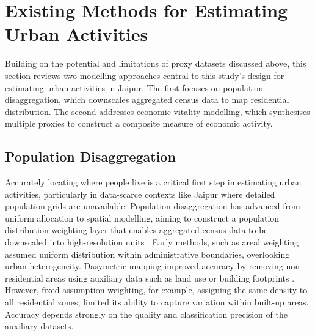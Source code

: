 \documentclass[
  12pt,
  oneside]{book}
\begin{document}
\section{Existing Methods for Estimating Urban Activities}\label{existing-methods-for-estimating-urban-activities}

Building on the potential and limitations of proxy datasets discussed above, this section reviews two modelling approaches central to this study's design for estimating urban activities in Jaipur. The first focuses on population disaggregation, which downscales aggregated census data to map residential distribution. The second addresses economic vitality modelling, which synthesises multiple proxies to construct a composite measure of economic activity.

\subsection{Population Disaggregation}\label{population-disaggregation}

Accurately locating where people live is a critical first step in estimating urban activities, particularly in data-scarce contexts like Jaipur where detailed population grids are unavailable. Population disaggregation has advanced from uniform allocation to spatial modelling, aiming to construct a population distribution weighting layer that enables aggregated census data to be downscaled into high-resolution units \autocite{sapenaEmpiricRecommendationsPopulation2022}. Early methods, such as areal weighting assumed uniform distribution within administrative boundaries, overlooking urban heterogeneity. Dasymetric mapping improved accuracy by removing non-residential areas using auxiliary data such as land use or building footprints \autocite{pajaresPopulationDisaggregationBuilding2021}. However, fixed-assumption weighting, for example, assigning the same density to all residential zones, limited its ability to capture variation within built-up areas. Accuracy depends strongly on the quality and classification precision of the auxiliary datasets.
\end{document}
